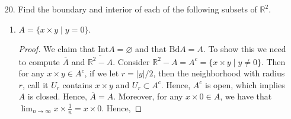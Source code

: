 \documentclass[12pt]{article}
\theoremstyle{definition}
\newcommand{\abs}[1]{\lvert #1 \rvert}
\begin{document}
\begin{enumerate}
\begin{enumerate}[label=(\alph*)]
\begin{proof}
                        $x\in U'=\overline{U}-U$ and this implies $x\notin U$. 
                        Hence, every point of $U$ is an interior point. 
                        Therefore, $U$ is open. 
                    \end{proof}
                \item If $U$ is open, is it true that $U=\text{Int}(\overline{U})$? Justify your answer.
                    \begin{proof}
                        This is not true. Suppose $A$ is open. Then $A\subset\text{Int}A$, 
                        since the interior is the union of all open sets 
                        containing $A$. By definition of interior, we also 
                        have that $\text{Int}A\subset A$. Thus if $A$ 
                        is open, then $A=\text{Int}A$. Now the question is, 
                        if $A$ is open does $\text{Int}A=\text{Int}(\overline{A})$. 
                        For a counter example, consider the set 
                        $A=(-1,0)\cup(0,1)$. We have that $A$ is open and 
                        that $\text{Int}A=A$. However, $\overline{A}=[-1,1]$ 
                        and so $\text{Int}(\overline{A})=(-1,1)$. Thus the two sets 
                        are not equal.
                    \end{proof}
            \end{enumerate}
        \item[20.] Find the boundary and interior of each of the following subsets of $\mathbb{R}^2$.
            \begin{enumerate}[label=(\alph*)]
                \item $A=\{x\times y\mid y=0\}$.
                    \begin{proof}
                        We claim that $\text{Int}A=\varnothing$ and that
                        $\text{Bd}A = A$. To show this we need to compute
                        $\overline{A}$ and $\overline{\mathbb{R}^2-A}$.
                        Consider $\mathbb{R}^2-A=A^c=\{x\times y\mid y\neq 0\}$.
                        Then for any $x\times y\in A^c$, if we let
                        $r=\abs{y}/2$, then the neighborhood with radius $r$,
                        call it $U_r$ contains $x\times y$ and $U_r\subset A^c$. 
                        Hence, $A^c$ is open, which implies $A$ is
                        closed. Hence, $\overline{A}=A$. Moreover, for any
                        $x\times 0\in A$, we have that
                        $\lim_{n\to\infty}x\times\frac{1}{n}=x\times 0$. Hence,

\end{proof}
\end{enumerate}
\end{enumerate}
\end{document}
